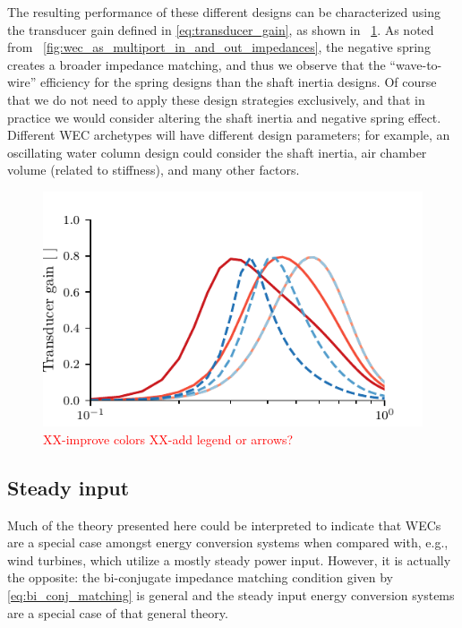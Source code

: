 \documentclass[lettersize,journal]{IEEEtran}
\newcommand{\rc}[1]{\textcolor{red}{#1}}
\begin{document}
The resulting performance of these different designs can be characterized using the transducer gain defined in \eqref{eq:transducer_gain}, as shown in \figurename~\ref{fig:wec_as_multiport_spring_inertia_transducer_gains}.
As noted from \figurename~\ref{fig:wec_as_multiport_in_and_out_impedances}, the negative spring creates a broader impedance matching, and thus we observe that the ``wave-to-wire'' efficiency for the spring designs than the shaft inertia designs.
Of course that we do not need to apply these design strategies exclusively, and that in practice we would consider altering the shaft inertia and negative spring effect.
Different WEC archetypes will have different design parameters; for example, an oscillating water column design could consider the shaft inertia, air chamber volume (related to stiffness), and many other factors.

\begin{figure}[tb]
        \centering
        \includegraphics[width=1\columnwidth]{wec_as_multiport_spring_inertia_transducer_gains.pdf}
        \caption{\rc{XX-improve colors} \rc{XX-add legend or arrows?}}
        \label{fig:wec_as_multiport_spring_inertia_transducer_gains}
\end{figure}

\subsection{Steady input}\label{sec:steady_input}
Much of the theory presented here could be interpreted to indicate that WECs are a special case amongst energy conversion systems when compared with, e.g., wind turbines, which utilize a mostly steady power input.
However, it is actually the opposite: the bi-conjugate impedance matching condition given by \eqref{eq:bi_conj_matching} is general and the steady input energy conversion systems are a special case of that general theory.
\end{document}
